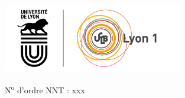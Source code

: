 


\afterpage{\restoregeometry}

%

\setlength{\parindent}{0pt}
\thispagestyle{empty}


\begin{center}
\includegraphics[height=3cm]{03_GraphicFiles/pageDeGarde/logo} %
\end{center}


\fontsize{11pt}{13pt}\selectfont
N\textsuperscript{o} d'ordre NNT : xxx

\vspace{1cm}

